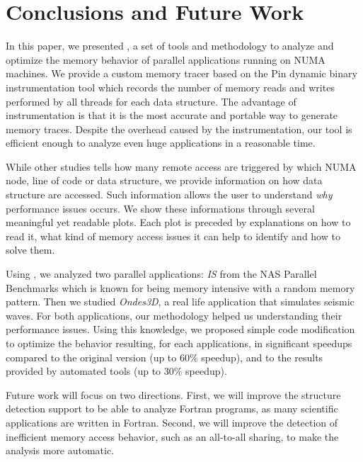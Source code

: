 
\section{Conclusions and Future Work}
\label{sec:concl}

In this paper, we presented \TABARNAC, a set of tools and methodology to analyze and
optimize the memory behavior of parallel applications running on NUMA
machines. We provide a custom memory tracer
based on the Pin dynamic binary instrumentation tool which records the
number of memory reads and writes performed by all threads for each data structure.
The advantage of instrumentation is that it is the most
accurate and portable way to generate memory traces.
Despite the overhead caused by the instrumentation, our tool is efficient enough to analyze even huge applications in a reasonable time.

While other studies tells how many remote access are triggered by which NUMA
node, line of code or data structure, we provide information on how data
structure are accessed. Such information allows the user to understand
\emph{why} performance issues occurs. We show these informations through
several  meaningful yet readable plots. Each plot is preceded by explanations
on how to read it, what kind of memory access issues it can help to identify
and how to solve them.

Using \TABARNAC, we analyzed two parallel applications: \emph{IS} from the NAS
Parallel Benchmarks which is known for being memory intensive with a random
memory pattern. Then we studied \emph{Ondes3D}, a real life application that
simulates seismic waves. For both applications, our methodology helped us
understanding their performance issues.  Using this knowledge, we proposed
simple code modification to optimize the behavior resulting, for each
applications, in significant speedups compared to the original version (up to
$60\%$ speedup), and to the results provided by automated tools (up to $30\%$
speedup).

Future work will focus on two directions. First, we will improve the
structure detection support to be able to analyze Fortran programs, as many
scientific applications are written in Fortran. Second, we will improve the
detection of inefficient memory access behavior, such as an all-to-all
sharing, to make the analysis more automatic.

